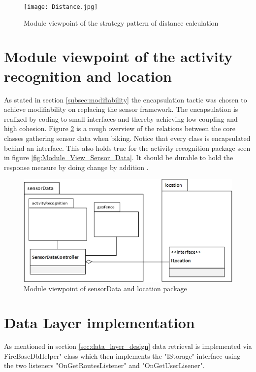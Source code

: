 \begin{figure}[H]
\centering
\texttt{[image: Distance.jpg]}
\caption{Module viewpoint of the strategy pattern of distance calculation}
\label{fig:module_view_distance_calculation}
\end{figure}

\section{Module viewpoint of the activity recognition and location}
As stated in section \ref{subsec:modifiability} the encapsulation tactic was chosen to achieve modifiability on replacing the sensor framework. The encapsulation is realized by coding to small interfaces and thereby achieving low coupling and high cohesion. Figure \ref{fig:activity_regonition_module_viewpoint} is a rough overview of the relations between the core classes gathering sensor data when biking.  
Notice that every class is encapsulated behind an interface. This also holds true for the activity recognition package seen in figure \ref{fig:Module_View_Sensor_Data}. It should be durable to hold the response measure by doing change by addition \cite{Baerbak10}.    

\begin{figure}[H]
\centering
\includegraphics[scale=0.6]{ActivityRegonitionModuleViewpoint.jpg}
\caption{Module viewpoint of sensorData and location package}
\label{fig:activity_regonition_module_viewpoint}
\end{figure}


\section{Data Layer implementation}

As mentioned in section \ref{sec:data_layer_design} data retrieval is implemented via FireBaseDbHelper" class which then implements the "IStorage" interface using the two listeners "OnGetRoutesListener" and "OnGetUserLisener".

